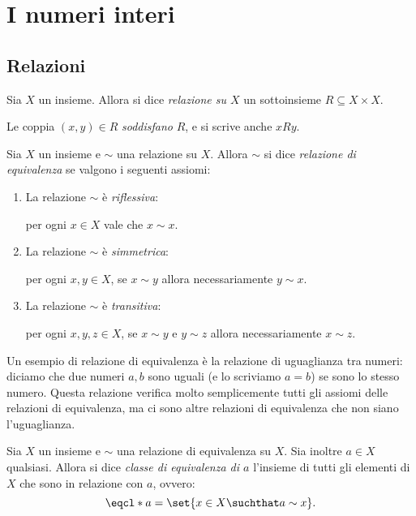 \chapter{I numeri interi}

\section{Relazioni}

\begin{definition}
    Sia $X$ un insieme. Allora si dice \emph{relazione su $X$} un sottoinsieme $R \subseteq X \times X$. 
    
    Le coppia $(x, y) \in R$ \emph{soddisfano} $R$, e si scrive anche $xRy$. 
\end{definition}

\begin{definition}
    Sia $X$ un insieme e $\sim$ una relazione su $X$. Allora $\sim$ si dice \emph{relazione di equivalenza} se valgono i seguenti assiomi: \begin{enumerate}[label={(EQ\arabic*)}]
        \item La relazione $\sim$ è \emph{riflessiva}:
        
        per ogni $x \in X$ vale che $x \sim x$.
        \item La relazione $\sim$ è \emph{simmetrica}:
        
        per ogni $x, y \in X$, se $x \sim y$ allora necessariamente $y \sim x$.
        \item La relazione $\sim$ è \emph{transitiva}:
        
        per ogni $x, y, z \in X$, se $x \sim y$ e $y \sim z$ allora necessariamente $x \sim z$.
    \end{enumerate}
\end{definition}

Un esempio di relazione di equivalenza è la relazione di uguaglianza tra numeri: diciamo che due numeri $a, b$ sono uguali (e lo scriviamo $a = b$) se sono lo stesso numero. Questa relazione verifica molto semplicemente tutti gli assiomi delle relazioni di equivalenza, ma ci sono altre relazioni di equivalenza che non siano l'uguaglianza.

\begin{definition}
    Sia $X$ un insieme e $\sim$ una relazione di equivalenza su $X$. Sia inoltre $a \in X$ qualsiasi. Allora si dice \emph{classe di equivalenza di $a$} l'insieme di tutti gli elementi di $X$ che sono in relazione con $a$, ovvero: \begin{equation}
        \eqcl*{a} = \set{x \in X \suchthat a \sim x}.
    \end{equation}
\end{definition}

